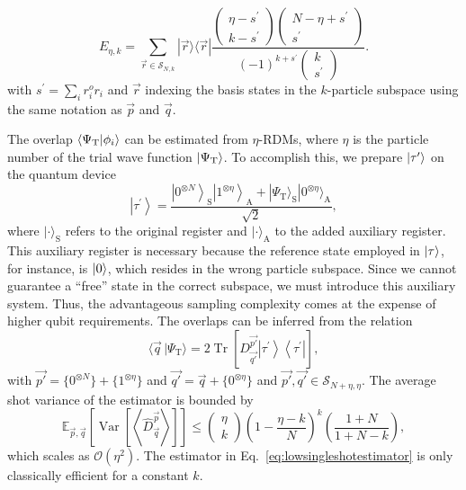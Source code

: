 \documentclass[../main.tex]{subfiles}
\begin{document}
\begin{equation}
 E_{\eta, k} = \sum_{\vec{r} \in \mathcal{S}_{N, k}}|\vec{r}\rangle\langle \vec{r}| \frac{\left(\begin{array}{c}
\eta-s^{\prime} \\
k-s^{\prime}
\end{array}\right)\left(\begin{array}{c}
N-\eta+s^{\prime} \\
s^{\prime}
\end{array}\right)}{(-1)^{k+s^{\prime}}\left(\begin{array}{c}
k \\
s^{\prime}
\end{array}\right)} .
\end{equation}
with $s^\prime = \sum_i r^o_i r_i$ and $\vec{r}$ indexing the basis states in the $k$-particle subspace using the same notation as $\vec{p}$ and $\vec{q}$.

The overlap $\braket{\Psi_\mathrm{T}}{\phi_i}$ can be estimated from $\eta$-RDMs, where $\eta$ is the particle number of the trial wave function $\ket{\Psi_\mathrm{T}}$. To accomplish this, we prepare $\ket{\tau'}$ on the quantum device \cite{low2022classical}
\begin{equation}
\left|\tau^\prime\right\rangle=\frac{\left|0^{\otimes N}\right\rangle_\text{S}\left|1^{\otimes \eta}\right\rangle_\text{A}+ |\Psi_\mathrm{T}\rangle_\text{S} |0^{\otimes\eta}\rangle_\text{A}}{\sqrt{2}},
\end{equation}
 where $|\cdot\rangle_\text{S}$ refers to the original register and $|\cdot\rangle_\text{A}$ to the added auxiliary register. This auxiliary register is necessary because the reference state employed in $\ket{\tau}$, for instance, is $\ket{0}$, which resides in the wrong particle subspace. Since we cannot guarantee a  ``free'' state in the correct subspace, we must introduce this auxiliary system. Thus, the advantageous sampling complexity comes at the expense of higher qubit requirements. 
The overlaps can be inferred from the relation \cite{low2022classical}
 \begin{equation}
     \langle\vec{q} \, | \Psi_\mathrm{T}\rangle = 2\operatorname{Tr}\left[D_{\vec{q'} }^{\vec{p'} }\left|\tau^{\prime}\right\rangle\left\langle\tau^{\prime}\right|\right] ,
\label{eq:overlapfromrdmlow}
 \end{equation}
 with $\vec{p'} = \{0^{\otimes N}\}+\{1^{\otimes \eta}\}$ and $\vec{q'} = \vec{q}+ \{0^{\otimes \eta}\}$ and $\vec{p'},\vec{q'} \in  \mathcal{S}_{N+\eta, \eta}$.
The average shot variance of the estimator is bounded by
\begin{equation}
\label{eq:lowbound}
    \mathbb{E}_{\vec{p}, \vec{q}}\left[\operatorname{Var}\left[\left\langle\hat{D}_{\vec{q}}^{\vec{p}}\right\rangle\right]\right] \leq\left(\begin{array}{l}
\eta \\
k
\end{array}\right)\left(1-\frac{\eta-k}{N}\right)^k\left(\frac{1+N}{1+N-k}\right),
\end{equation}
which scales as $\mathcal{O}(\eta^2)$. The estimator in Eq.~\ref{eq:lowsingleshotestimator} is only classically efficient for a constant $k$. 
\end{document}
